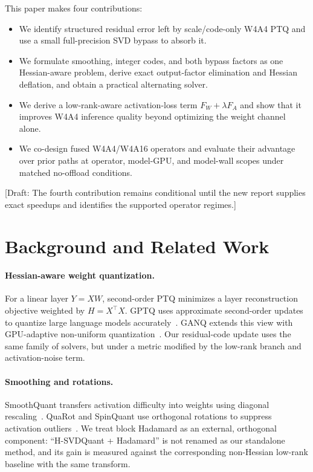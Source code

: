 \documentclass{article}
\newcommand{\method}{H-SVDQuant}
\newcommand{\draftnote}[1]{\textcolor{red!70!black}{[Draft: #1]}}
\begin{document}
This paper makes four contributions:
\begin{itemize}
    \item We identify structured residual error left by scale/code-only W4A4
    PTQ and use a small full-precision SVD bypass to absorb it.
    \item We formulate smoothing, integer codes, and both bypass factors as one
    Hessian-aware problem, derive exact output-factor elimination and Hessian
    deflation, and obtain a practical alternating solver.
    \item We derive a low-rank-aware activation-loss term
    $F_W+\lambda F_A$ and show that it improves W4A4 inference quality beyond
    optimizing the weight channel alone.
    \item We co-design fused W4A4/W4A16 operators and evaluate their advantage
    over prior paths at operator, model-GPU, and model-wall scopes under matched
    no-offload conditions.
\end{itemize}
\draftnote{The fourth contribution remains conditional until the new report
supplies exact speedups and identifies the supported operator regimes.}

\section{Background and Related Work}

\paragraph{Hessian-aware weight quantization.}
For a linear layer $Y=XW$, second-order PTQ minimizes a layer reconstruction
objective weighted by $H=X^\top X$. GPTQ uses approximate second-order updates
to quantize large language models accurately~\citep{frantar2022gptq}. GANQ
extends this view with GPU-adaptive non-uniform quantization~\citep{zhao2025ganq}.
Our residual-code update uses the same family of solvers, but under a metric
modified by the low-rank branch and activation-noise term.

\paragraph{Smoothing and rotations.}
SmoothQuant transfers activation difficulty into weights using diagonal
rescaling~\citep{xiao2023smoothquant}. QuaRot and SpinQuant use orthogonal
rotations to suppress activation outliers~\citep{ashkboos2024quarot,liu2024spinquant}.
We treat block Hadamard as an external, orthogonal component: ``\method{} +
Hadamard'' is not renamed as our standalone method, and its gain is measured
against the corresponding non-Hessian low-rank baseline with the same transform.
\end{document}
